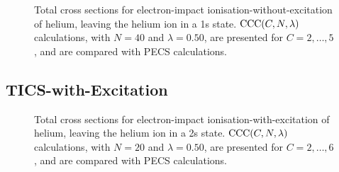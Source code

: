 \documentclass[]{article}
\begin{document}
\begin{figure}[h]
  \begin{center}
    
  \end{center}
  \caption[TICS-without-excitation: $\mathrm{CCC}\lr{C, 40, 0.50}$]{
    Total cross sections for electron-impact ionisation-without-excitation of
    helium, leaving the helium ion in a 1s state.
    $\mathrm{CCC}(C, N, \lambda)$ calculations, with $N = 40$ and
    $\lambda = 0.50$, are presented for $C = 2, \dotsc, 5$, and are compared
    with PECS \cite{PhysRevA.81.022716} calculations.
  }
  \label{fig:cs_tics_iw_40}
\end{figure}

%     

\clearpage

\subsection{TICS-with-Excitation}
\label{sec:re-tics-ie}



\begin{figure}[h]
  \begin{center}
    
  \end{center}
  \caption[TICS-with-excitation: $\mathrm{CCC}\lr{C, 20, 0.50}$]{
    Total cross sections for electron-impact ionisation-with-excitation of
    helium, leaving the helium ion in a 2s state.
    $\mathrm{CCC}(C, N, \lambda)$ calculations, with $N = 20$ and
    $\lambda = 0.50$, are presented for $C = 2, \dotsc, 6$, and are compared
    with PECS \cite{PhysRevA.81.022716} calculations.
  }
  \label{fig:cs_tics_ie_n_20}
\end{figure}
\end{document}
